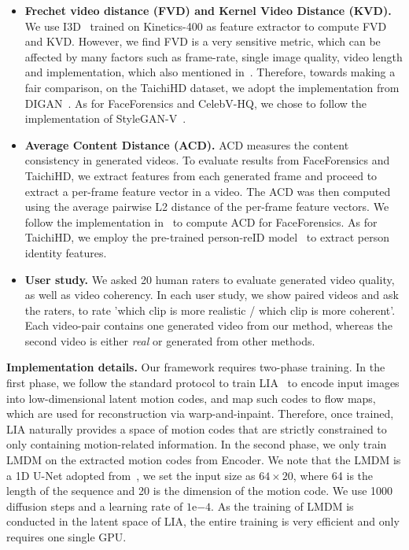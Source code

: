 \begin{itemize}
\item \textbf{Frechet video distance (FVD) and Kernel Video Distance (KVD).} We use I3D~\citep{carreira2017quo} trained on Kinetics-400 as feature extractor to compute FVD and KVD. However, we find FVD is a very sensitive metric, which can be affected by many factors such as frame-rate, single image quality, video length and implementation, which also mentioned in~\citep{stylegan-v}. Therefore, towards making a fair comparison, on the TaichiHD dataset, we adopt the implementation from DIGAN~\citep{digan}. As for FaceForensics and CelebV-HQ, we chose to follow the implementation of StyleGAN-V~\citep{stylegan-v}. 
\item \textbf{Average Content Distance (ACD).} ACD measures the content consistency in generated videos. To evaluate results from FaceForensics and TaichiHD, we extract features from each generated frame and proceed to extract a per-frame feature vector in a video. The ACD was then computed using the average pairwise L2 distance of the per-frame feature vectors. We follow the implementation in~\citep{mocoganhd} to compute ACD for FaceForensics. As for TaichiHD, we employ the pre-trained person-reID model~\citep{zheng2018discriminatively} to extract person identity features.
\item \textbf{User study.} We asked 20 human raters to evaluate generated video quality, as well as video coherency. In each user study, we show paired videos and ask the raters, to rate 'which clip is more realistic / which clip is more coherent'. Each video-pair contains one generated video from our method, whereas the second video is either \textit{real} or generated from other methods.

\end{itemize}

\textbf{Implementation details.} Our framework requires two-phase training. In the first phase, we follow the standard protocol to train LIA~\citep{wang2022latent} to encode input images into low-dimensional latent motion codes, and map such codes to flow maps, which are used for reconstruction via warp-and-inpaint. Therefore, once trained, LIA naturally provides a space of motion codes that are strictly constrained to only containing motion-related information. In the second phase, we only train LMDM on the extracted motion codes from Encoder. We note that the LMDM is a 1D U-Net adopted from~\citep{nichol2021improved}, we set the input size as $64\times 20$, where 64 is the length of the sequence and 20 is the dimension of the motion code. We use 1000 diffusion steps and a learning rate of $1\mathrm{e}{-4}$. As the training of LMDM is conducted in the latent space of LIA, the entire training is very efficient and only requires one single GPU. 

